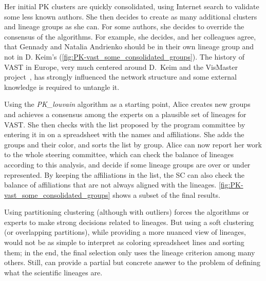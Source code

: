 Her initial PK clusters are quickly consolidated, using Internet search to validate some less known authors. She then decides to create as many additional clusters and lineage groups as she can.
For some authors, she decides to override the consensus of the algorithms. For example, she decides, and her colleagues agree, that Gennady and Natalia Andrienko should be in their own lineage group and not in D. Keim's (\autoref{fig:PK-vast_some_consolidated_groups}). The history of VAST in Europe, very much centered around D.\ Keim and the VisMaster project~\cite{VisMaster}, has strongly influenced the network structure and some external knowledge is required to untangle it.

Using the \emph{PK\_louvain} algorithm as a starting point, Alice creates new groups and achieves a consensus among the experts on a plausible set of lineages for VAST.
She then checks with the list proposed by the program committee by entering it in on a spreadsheet with the names and affiliations. She adds the groups and their color, and sorts the list by group.
Alice can now report her work to the whole steering committee, which can check the balance of lineages according to this analysis, and decide if some lineage groups are over or under represented.  By keeping the affiliations in the list, the SC can also check the balance of affiliations that are not always aligned with the lineages.
\autoref{fig:PK-vast_some_consolidated_groups} shows a subset of the final results.


Using partitioning clustering (although with outliers) forces the algorithms or experts to make strong decisions related to lineages. But using a soft clustering (or overlapping partitions), while providing a more nuanced view of lineages, would not be as simple to interpret as coloring spreadsheet lines and sorting them;
in the end, the final selection only uses the lineage criterion among many others. Still, \pkclustering can provide a partial but concrete answer to the problem of defining what the scientific lineages are.

